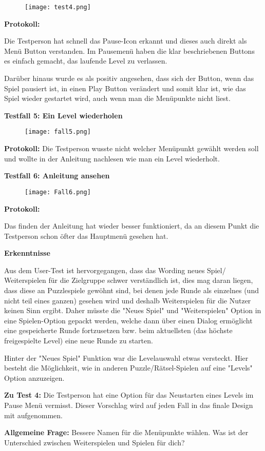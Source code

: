 \documentclass[12pt, a4paper]{article}
\begin{document}
\begin{figure}[H]
\centering
\texttt{[image: test4.png]}
\end{figure}
\textbf{Protokoll:}
\par\bigskip
Die Testperson hat schnell das Pause-Icon erkannt und dieses auch direkt als Menü Button verstanden. Im Pausemenü haben die klar beschriebenen Buttons es einfach gemacht, das laufende Level zu verlassen.
\par\bigskip
Darüber hinaus wurde es als positiv angesehen, dass sich der Button, wenn das Spiel pausiert ist, in einen Play Button verändert und somit klar ist, wie das Spiel wieder gestartet wird, auch wenn man die Menüpunkte nicht liest.

\newpage
\textbf{Testfall 5: Ein Level wiederholen}
\begin{figure}[H]
\centering
\texttt{[image: fall5.png]}
\end{figure}
\textbf{Protokoll:}\newline
Die Testperson wusste nicht welcher Menüpunkt gewählt werden soll und wollte in der Anleitung nachlesen wie man ein Level wiederholt.

\newpage
\textbf{Testfall 6: Anleitung ansehen}
\begin{figure}[H]
\centering
\texttt{[image: Fall6.png]}
\end{figure}
\textbf{Protokoll:}
\par\bigskip
Das finden der Anleitung hat wieder besser funktioniert, da an diesem Punkt die Testperson schon öfter das Hauptmenü gesehen hat.

\newpage
\textbf{Erkenntnisse}
\par\bigskip
Aus dem User-Test ist hervorgegangen, dass das Wording neues Spiel/ Weiterspielen für die Zielgruppe schwer verständlich ist, dies mag daran liegen, dass diese an Puzzlespiele gewöhnt sind, bei denen jede Runde als einzelnes (und nicht teil eines ganzen) gesehen wird und deshalb Weiterspielen für die Nutzer keinen Sinn ergibt. Daher müsste die "Neues Spiel" und "Weiterspielen" Option in eine Spielen-Option gepackt werden, welche dann über einen Dialog ermöglicht eine gespeicherte Runde fortzusetzen bzw. beim aktuellsten (das höchste freigespielte Level) eine neue Runde zu starten.

\par\bigskip 
Hinter der "Neues Spiel" Funktion war die Levelauswahl etwas versteckt. Hier besteht die Möglichkeit, wie in anderen Puzzle/Rätsel-Spielen auf eine "Levels" Option anzuzeigen.

\par\bigskip
\textbf{Zu Test 4:} Die Testperson hat eine Option für das Neustarten eines Levels im Pause Menü vermisst. Dieser Vorschlag wird auf jeden Fall in das finale Design mit aufgenommen.

\par\bigskip

\textbf{Allgemeine Frage:} Bessere Namen für die Menüpunkte wählen.
Was ist der Unterschied zwischen Weiterspielen und Spielen für dich?
\end{document}
